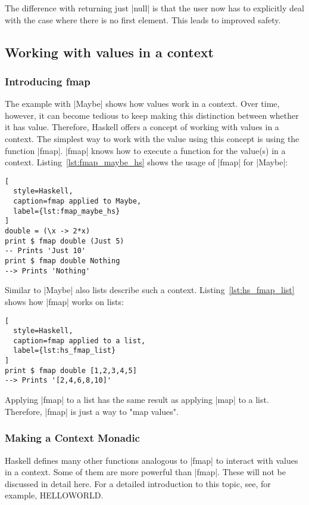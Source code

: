 The difference with returning just |null| is that the user now has to
explicitly deal with the case where there is no first element. This leads to
improved safety.

\subsection{Working with values in a context} %
\label{sub:Working with values in a context}
\subsubsection{Introducing fmap} %
\label{subsub:Introducing fmap}
The example with |Maybe| shows how values work in a context. Over time,
however, it can become tedious to keep making this distinction between whether
it has value. Therefore, Haskell offers a concept of working with values in a
context. The simplest way to work with the value using this concept is using
the function |fmap|. |fmap| knows how to execute a function for the value(s) in
a context. Listing~\ref{lst:fmap_maybe_hs} shows the usage of |fmap| for
|Maybe|:

\begin{lstlisting}[
  style=Haskell,
  caption=fmap applied to Maybe,
  label={lst:fmap_maybe_hs}
]
double = (\x -> 2*x)
print $ fmap double (Just 5)
-- Prints 'Just 10' 
print $ fmap double Nothing
--> Prints 'Nothing'
\end{lstlisting}

Similar to |Maybe| also lists describe such a context.
Listing~\ref{lst:hs_fmap_list} shows how |fmap| works on lists:

\begin{lstlisting}[
  style=Haskell,
  caption=fmap applied to a list,
  label={lst:hs_fmap_list}
]
print $ fmap double [1,2,3,4,5]
--> Prints '[2,4,6,8,10]'
\end{lstlisting}

Applying |fmap| to a list has the same result as applying |map| to a list.
Therefore, |fmap| is just a way to "map values".

\subsubsection{Making a Context Monadic} %
\label{sec:Making a Context Monadic}
Haskell defines many other functions analogous to |fmap| to interact with
values in a context. Some of them are more powerful than |fmap|. These will not
be discussed in detail here. For a detailed introduction to this topic, see,
for example, HELLOWORLD. \\

